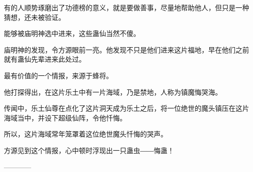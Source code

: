 \begin{this_body}
有的人顺势琢磨出了功德榜的意义，就是要做善事，尽量地帮助他人，但只是一种猜想，还未被验证。

能够被庙明神选中进来，这些蛊仙当然不傻。

庙明神的发现，令方源眼前一亮。他发现不只是他们进来这片福地，早在他们之前就有蛊仙先辈进来此处过。

最有价值的一个情报，来源于蜂将。

他打探得出，在这片乐土中有一片海域，乃是禁地，人称为镇魔悔哭海。

传闻中，乐土仙尊在点化了这片洞天成为乐土之后，将一位绝世的魔头镇压在这片海域当中，并设下超级仙阵，令他忏悔。

所以，这片海域常年笼罩着这位绝世魔头忏悔的哭声。

方源见到这个情报，心中顿时浮现出一只蛊虫――悔蛊！

------------

\end{this_body}

